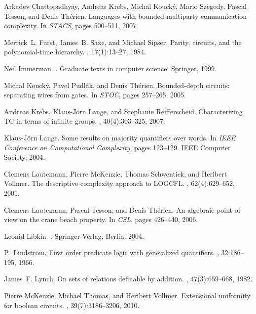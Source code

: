 \documentclass[envcountsame]{llncs}
\begin{document}
\begin{thebibliography}{10}
Arkadev Chattopadhyay, Andreas Krebs, Michal Kouck{\'y}, Mario Szegedy, Pascal
  Tesson, and Denis Th{\'e}rien.
\newblock Languages with bounded multiparty communication complexity.
\newblock In {\em STACS}, pages 500--511, 2007.

Merrick~L. Furst, James~B. Saxe, and Michael Sipser.
\newblock Parity, circuits, and the polynomial-time hierarchy.
, 17(1):13--27, 1984.

Neil Immerman.
.
\newblock Graduate texts in computer science. Springer, 1999.

Michal Kouck{\'y}, Pavel Pudl{\'a}k, and Denis Th{\'e}rien.
\newblock Bounded-depth circuits: separating wires from gates.
\newblock In {\em STOC}, pages 257--265, 2005.

Andreas Krebs, Klaus-J{\"o}rn Lange, and Stephanie Reifferscheid.
\newblock Characterizing {TC} in terms of infinite groups.
, 40(4):303--325, 2007.

Klaus-J{\"o}rn Lange.
\newblock Some results on majority quantifiers over words.
\newblock In {\em IEEE Conference on Computational Complexity}, pages 123--129.
  IEEE Computer Society, 2004.

Clemens Lautemann, Pierre McKenzie, Thomas Schwentick, and Heribert Vollmer.
\newblock The descriptive complexity approach to {LOGCFL}.
, 62(4):629--652, 2001.

Clemens Lautemann, Pascal Tesson, and Denis Th{\'e}rien.
\newblock An algebraic point of view on the crane beach property.
\newblock In {\em CSL}, pages 426--440, 2006.

Leonid Libkin.
.
\newblock Springer-Verlag, Berlin, 2004.

P.~Lindstr{\"o}m.
\newblock First order predicate logic with generalized quantifiers.
, 32:186--195, 1966.

James~F. Lynch.
\newblock On sets of relations definable by addition.
, 47(3):659--668, 1982.

Pierre McKenzie, Michael Thomas, and Heribert Vollmer.
\newblock Extensional uniformity for boolean circuits.
, 39(7):3186--3206, 2010.


\end{thebibliography}
\end{document}
